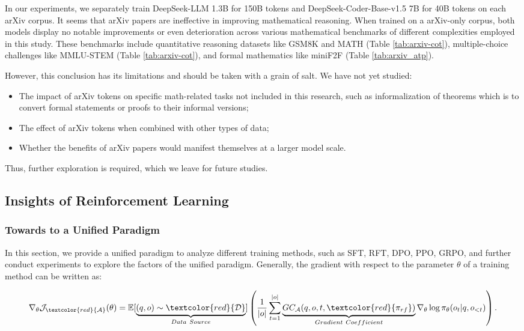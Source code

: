 In our experiments, we separately train DeepSeek-LLM 1.3B for 150B tokens and DeepSeek-Coder-Base-v1.5 7B for 40B tokens on each arXiv corpus. It seems that arXiv papers are ineffective in improving mathematical reasoning. When trained on a arXiv-only corpus, both models display no notable improvements or even deterioration across various mathematical benchmarks of different complexities employed in this study. These benchmarks include quantitative reasoning datasets like GSM8K and MATH (Table \ref{tab:arxiv-cot}), multiple-choice challenges like MMLU-STEM (Table \ref{tab:arxiv-cot}), and formal mathematics like miniF2F (Table \ref{tab:arxiv_atp}).

However, this conclusion has its limitations and should be taken with a grain of salt. We have not yet studied:

\begin{itemize}[topsep=0pt]
    \item The impact of arXiv tokens on specific math-related tasks not included in this research, such as informalization of theorems which is to convert formal statements or proofs to their informal versions;
    \item The effect of arXiv tokens when combined with other types of data;
    \item Whether the benefits of arXiv papers would manifest themselves at a larger model scale.
\end{itemize}

Thus, further exploration is required, which we leave for future studies.

\subsection{Insights of Reinforcement Learning}
\subsubsection{Towards to a Unified Paradigm} In this section, we provide a unified paradigm to analyze different training methods, such as SFT, RFT, DPO, PPO, GRPO, and further conduct experiments to explore the factors of the unified paradigm. Generally, the gradient with respect to the parameter $\theta$ of a training method can be written as:

\begin{equation}
    \nabla_{\theta}\mathcal{J}_{\textcolor{red}{\mathcal{A}}}(\theta) = \mathbb{E}[\underbrace{(q,o) \sim \textcolor{red}{\mathcal{D}}}_{Data \ Source}]\left( \frac{1}{|o|} \sum_{t=1}^{|o|}  \underbrace{GC_{{\mathcal{A}}}(q, o, t, \textcolor{red}{\pi_{{rf}}})}_{Gradient \ Coefficient}  \nabla_{\theta}\log \pi_{\theta}(o_t | q, o_{<t})\right).
\label{eq:objective}
\end{equation}

